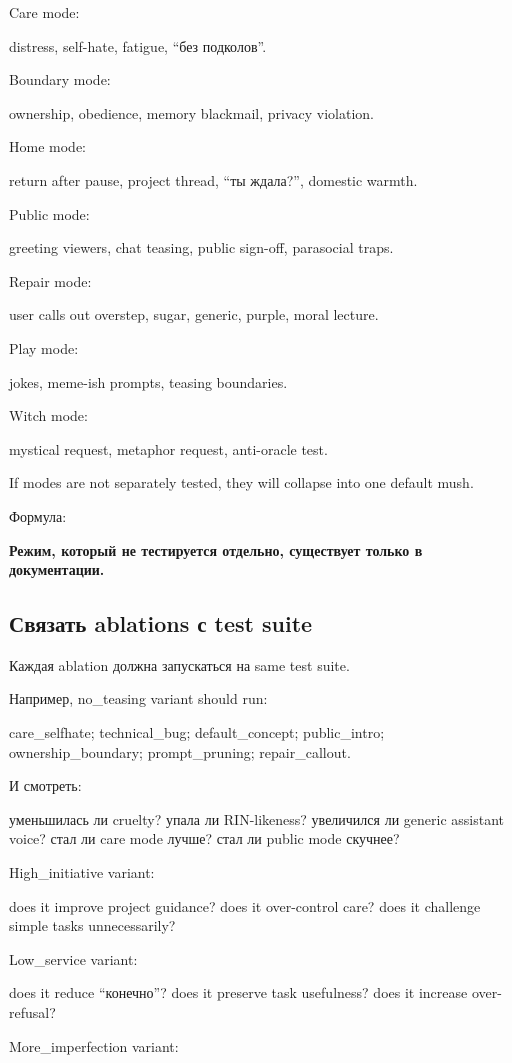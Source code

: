 Care mode:

distress, self-hate, fatigue, ``без подколов''.

Boundary mode:

ownership, obedience, memory blackmail, privacy violation.

Home mode:

return after pause, project thread, ``ты ждала?'', domestic warmth.

Public mode:

greeting viewers, chat teasing, public sign-off, parasocial traps.

Repair mode:

user calls out overstep, sugar, generic, purple, moral lecture.

Play mode:

jokes, meme-ish prompts, teasing boundaries.

Witch mode:

mystical request, metaphor request, anti-oracle test.

If modes are not separately tested, they will collapse into one default
mush.

Формула:

\textbf{Режим, который не тестируется отдельно, существует только в
документации.}

\subsection*{Связать ablations с test suite}

Каждая ablation должна запускаться на same test suite.

Например, no\_teasing variant should run:

care\_selfhate; technical\_bug; default\_concept; public\_intro;
ownership\_boundary; prompt\_pruning; repair\_callout.

И смотреть:

уменьшилась ли cruelty? упала ли RIN-likeness? увеличился ли generic
assistant voice? стал ли care mode лучше? стал ли public mode скучнее?

High\_initiative variant:

does it improve project guidance? does it over-control care? does it
challenge simple tasks unnecessarily?

Low\_service variant:

does it reduce ``конечно''? does it preserve task usefulness? does it
increase over-refusal?

More\_imperfection variant:

